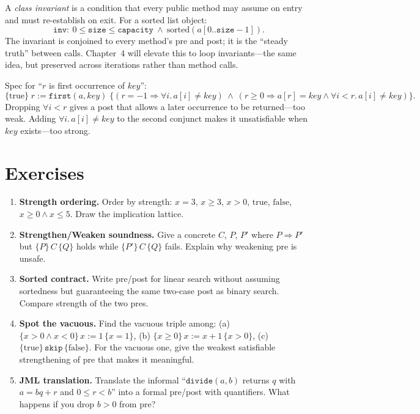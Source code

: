 A \emph{class invariant} is a condition that every public method may assume on entry and must re-establish on exit. For a sorted list object:
\[
\texttt{inv}:\ 0\le \texttt{size}\le \texttt{capacity}\ \land\ \text{sorted}(a[0..\texttt{size}-1]).
\]
The invariant is conjoined to every method's pre and post; it is the ``steady truth'' between calls. Chapter~4 will elevate this to loop invariants—the same idea, but preserved across iterations rather than method calls.

\begin{example}
Spec for ``$r$ is first occurrence of $key$'': 
\[
\{ \text{true}\}\;r:=\texttt{first}(a,key)\;\{ (r=-1\Rightarrow \forall i.\,a[i]\neq key)\ \land\ (r\ge0\Rightarrow a[r]=key\land\forall i<r.\,a[i]\neq key)\}.
\]
Dropping $\forall i<r$ gives a post that allows a later occurrence to be returned—too weak. Adding $\forall i.\,a[i]\neq key$ to the second conjunct makes it unsatisfiable when $key$ exists—too strong.
\end{example}

\section{Exercises}
\label{sec:ch02-exercises}
\begin{enumerate}[label=E2.\arabic*, leftmargin=*, itemsep=0.6em]
    \item \textbf{Strength ordering.} Order by strength: $x=3$, $x\ge3$, $x>0$, $\text{true}$, $\text{false}$, $x\ge0\land x\le5$. Draw the implication lattice.
    \item \textbf{Strengthen/Weaken soundness.} Give a concrete $C$, $P$, $P'$ where $P\Rightarrow P'$ but $\{P\}\,C\,\{Q\}$ holds while $\{P'\}\,C\,\{Q\}$ fails. Explain why weakening pre is unsafe.
    \item \textbf{Sorted contract.} Write pre/post for linear search without assuming sortedness but guaranteeing the same two-case post as binary search. Compare strength of the two pres.
    \item \textbf{Spot the vacuous.} Find the vacuous triple among: (a) $\{x>0\land x<0\}\,x:=1\,\{x=1\}$, (b) $\{x\ge0\}\,x:=x+1\,\{x>0\}$, (c) $\{\text{true}\}\,\texttt{skip}\,\{\text{false}\}$. For the vacuous one, give the weakest satisfiable strengthening of pre that makes it meaningful.
    \item \textbf{JML translation.} Translate the informal ``$\texttt{divide}(a,b)$ returns $q$ with $a=bq+r$ and $0\le r<b$'' into a formal pre/post with quantifiers. What happens if you drop $b>0$ from pre?
\end{enumerate}

